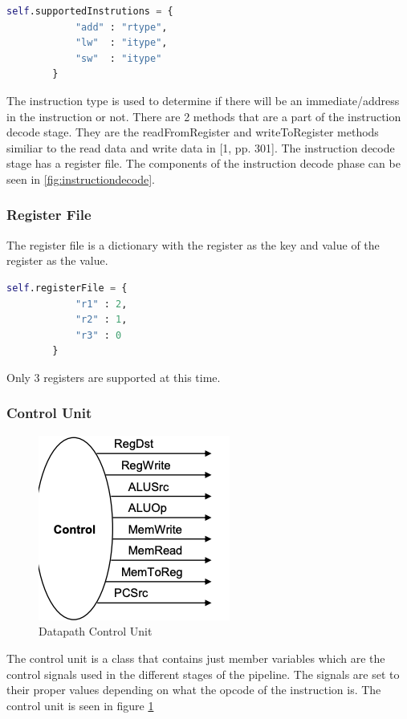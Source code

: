 \documentclass[conference]{IEEEtran}
\begin{document}
\begin{lstlisting}[language=Python]
self.supportedInstrutions = {
            "add" : "rtype",
            "lw"  : "itype",
            "sw"  : "itype"
        }
\end{lstlisting}

The instruction type is used to determine if there will be an immediate/address in the instruction or not. 
There are 2 methods that are a part of the instruction decode stage.  They are the readFromRegister and writeToRegister methods similiar to the read data and write data in [1, pp. 301].
The instruction decode stage has a register file.  The components of the instruction decode phase can be seen in \ref{fig:instructiondecode}.

\subsubsection{Register File}

The register file is a dictionary with the register as the key and value of the register as the value.

\begin{lstlisting}[language=Python]
self.registerFile = {
            "r1" : 2,
            "r2" : 1,
            "r3" : 0
        }
\end{lstlisting}
Only 3 registers are supported at this time.

\subsubsection{Control Unit}

\begin{figure}
    \centering
    \includegraphics[scale=.4]{controlunit.png}
    \caption{Datapath Control Unit}
    \label{fig:controlunit}
\end{figure}

The control unit is a class that contains just member variables which are the control signals used in the different stages of the pipeline.  The signals are set to their proper values depending on what the opcode of the instruction is.  The control unit is seen in figure \ref{fig:controlunit}
\end{document}
